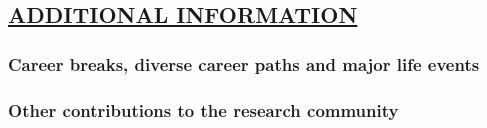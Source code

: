 
\subsection*{\underline{ADDITIONAL INFORMATION}}



\subsubsection*{Career breaks, diverse career paths and major life events}


\subsubsection*{Other contributions to the research community} 



